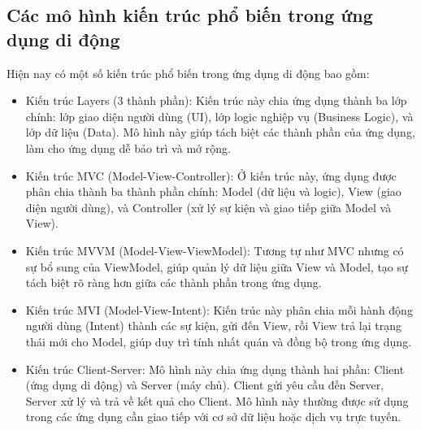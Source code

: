     \subsection{Các mô hình kiến trúc phổ biến trong ứng dụng di động}
    \renewcommand{\labelitemi}{--}
    \begin{flushleft}
        \hspace*{0.8cm}Hiện nay có một số kiến trúc phổ biến trong ứng dụng di động bao gồm:
        \setlength{\leftmargini}{1.5cm}
        \begin{itemize}
            \item Kiến trúc Layers (3 thành phần): Kiến trúc này chia ứng dụng thành ba lớp chính: lớp giao diện người dùng (UI), lớp logic nghiệp vụ (Business Logic), và lớp dữ liệu (Data). Mô hình này giúp tách biệt các thành phần của ứng dụng, làm cho ứng dụng dễ bảo trì và mở rộng.
            \item Kiến trúc MVC (Model-View-Controller): Ở kiến trúc này, ứng dụng được phân chia thành ba thành phần chính: Model (dữ liệu và logic), View (giao diện người dùng), và Controller (xử lý sự kiện và giao tiếp giữa Model và View).
            \item Kiến trúc MVVM (Model-View-ViewModel): Tương tự như MVC nhưng có sự bổ sung của ViewModel, giúp quản lý dữ liệu giữa View và Model, tạo sự tách biệt rõ ràng hơn giữa các thành phần trong ứng dụng.
            \item Kiến trúc MVI (Model-View-Intent): Kiến trúc này phân chia mỗi hành động người dùng (Intent) thành các sự kiện, gửi đến View, rồi View trả lại trạng thái mới cho Model, giúp duy trì tính nhất quán và đồng bộ trong ứng dụng.
            \item Kiến trúc Client-Server: Mô hình này chia ứng dụng thành hai phần: Client (ứng dụng di động) và Server (máy chủ). Client gửi yêu cầu đến Server, Server xử lý và trả về kết quả cho Client. Mô hình này thường được sử dụng trong các ứng dụng cần giao tiếp với cơ sở dữ liệu hoặc dịch vụ trực tuyến.
        \end{itemize}     
    \end{flushleft}

